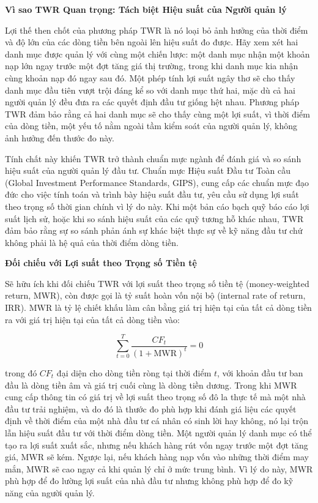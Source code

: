 \textbf{Vì sao TWR Quan trọng: Tách biệt Hiệu suất của Người quản lý}

Lợi thế then chốt của phương pháp TWR là nó loại bỏ ảnh hưởng của thời điểm và độ lớn của các dòng tiền bên ngoài lên hiệu suất đo được. Hãy xem xét hai danh mục được quản lý với cùng một chiến lược: một danh mục nhận một khoản nạp lớn ngay trước một đợt tăng giá thị trường, trong khi danh mục kia nhận cùng khoản nạp đó ngay sau đó. Một phép tính lợi suất ngây thơ sẽ cho thấy danh mục đầu tiên vượt trội đáng kể so với danh mục thứ hai, mặc dù cả hai người quản lý đều đưa ra các quyết định đầu tư giống hệt nhau. Phương pháp TWR đảm bảo rằng cả hai danh mục sẽ cho thấy cùng một lợi suất, vì thời điểm của dòng tiền, một yếu tố nằm ngoài tầm kiểm soát của người quản lý, không ảnh hưởng đến thước đo này.

Tính chất này khiến TWR trở thành chuẩn mực ngành để đánh giá và so sánh hiệu suất của người quản lý đầu tư. Chuẩn mực Hiệu suất Đầu tư Toàn cầu (Global Investment Performance Standards, GIPS), cung cấp các chuẩn mực đạo đức cho việc tính toán và trình bày hiệu suất đầu tư, yêu cầu sử dụng lợi suất theo trọng số thời gian chính vì lý do này. Khi một bản cáo bạch quỹ báo cáo lợi suất lịch sử, hoặc khi so sánh hiệu suất của các quỹ tương hỗ khác nhau, TWR đảm bảo rằng sự so sánh phản ánh sự khác biệt thực sự về kỹ năng đầu tư chứ không phải là hệ quả của thời điểm dòng tiền.

\textbf{Đối chiếu với Lợi suất theo Trọng số Tiền tệ}

Sẽ hữu ích khi đối chiếu TWR với lợi suất theo trọng số tiền tệ (money-weighted return, MWR), còn được gọi là tỷ suất hoàn vốn nội bộ (internal rate of return, IRR). MWR là tỷ lệ chiết khấu làm cân bằng giá trị hiện tại của tất cả dòng tiền ra với giá trị hiện tại của tất cả dòng tiền vào:

$$
\sum_{t=0}^{T} \frac{CF_t}{(1 + \text{MWR})^t} = 0
$$

trong đó $CF_t$ đại diện cho dòng tiền ròng tại thời điểm $t$, với khoản đầu tư ban đầu là dòng tiền âm và giá trị cuối cùng là dòng tiền dương. Trong khi MWR cung cấp thông tin có giá trị về lợi suất theo trọng số đô la thực tế mà một nhà đầu tư trải nghiệm, và do đó là thước đo phù hợp khi đánh giá liệu các quyết định về thời điểm của một nhà đầu tư cá nhân có sinh lời hay không, nó lại trộn lẫn hiệu suất đầu tư với thời điểm dòng tiền. Một người quản lý danh mục có thể tạo ra lợi suất xuất sắc, nhưng nếu khách hàng rút vốn ngay trước một đợt tăng giá, MWR sẽ kém. Ngược lại, nếu khách hàng nạp vốn vào những thời điểm may mắn, MWR sẽ cao ngay cả khi quản lý chỉ ở mức trung bình. Vì lý do này, MWR phù hợp để đo lường lợi suất của nhà đầu tư nhưng không phù hợp để đo kỹ năng của người quản lý.

